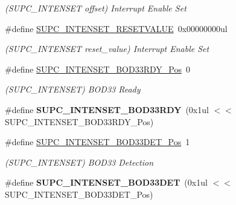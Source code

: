 \begin{DoxyCompactItemize}
\begin{DoxyCompactList}\small\item\em (S\+U\+P\+C\+\_\+\+I\+N\+T\+E\+N\+S\+E\+T offset) Interrupt Enable Set \end{DoxyCompactList}\item 
\hypertarget{group___s_a_m_l21___s_u_p_c_gade21ffefb957ba393b2251437347bd30}{}\#define \hyperlink{group___s_a_m_l21___s_u_p_c_gade21ffefb957ba393b2251437347bd30}{S\+U\+P\+C\+\_\+\+I\+N\+T\+E\+N\+S\+E\+T\+\_\+\+R\+E\+S\+E\+T\+V\+A\+L\+U\+E}~0x00000000ul\label{group___s_a_m_l21___s_u_p_c_gade21ffefb957ba393b2251437347bd30}

\begin{DoxyCompactList}\small\item\em (S\+U\+P\+C\+\_\+\+I\+N\+T\+E\+N\+S\+E\+T reset\+\_\+value) Interrupt Enable Set \end{DoxyCompactList}\item 
\hypertarget{group___s_a_m_l21___s_u_p_c_gac69cfc3d29da8df911624bea5c6ab276}{}\#define \hyperlink{group___s_a_m_l21___s_u_p_c_gac69cfc3d29da8df911624bea5c6ab276}{S\+U\+P\+C\+\_\+\+I\+N\+T\+E\+N\+S\+E\+T\+\_\+\+B\+O\+D33\+R\+D\+Y\+\_\+\+Pos}~0\label{group___s_a_m_l21___s_u_p_c_gac69cfc3d29da8df911624bea5c6ab276}

\begin{DoxyCompactList}\small\item\em (S\+U\+P\+C\+\_\+\+I\+N\+T\+E\+N\+S\+E\+T) B\+O\+D33 Ready \end{DoxyCompactList}\item 
\hypertarget{group___s_a_m_l21___s_u_p_c_ga1d2bc4dfde491e5a98c28a08dc4f8ec0}{}\#define {\bfseries S\+U\+P\+C\+\_\+\+I\+N\+T\+E\+N\+S\+E\+T\+\_\+\+B\+O\+D33\+R\+D\+Y}~(0x1ul $<$$<$ S\+U\+P\+C\+\_\+\+I\+N\+T\+E\+N\+S\+E\+T\+\_\+\+B\+O\+D33\+R\+D\+Y\+\_\+\+Pos)\label{group___s_a_m_l21___s_u_p_c_ga1d2bc4dfde491e5a98c28a08dc4f8ec0}

\item 
\hypertarget{group___s_a_m_l21___s_u_p_c_ga6217695225807518cf2378fae92dcf6d}{}\#define \hyperlink{group___s_a_m_l21___s_u_p_c_ga6217695225807518cf2378fae92dcf6d}{S\+U\+P\+C\+\_\+\+I\+N\+T\+E\+N\+S\+E\+T\+\_\+\+B\+O\+D33\+D\+E\+T\+\_\+\+Pos}~1\label{group___s_a_m_l21___s_u_p_c_ga6217695225807518cf2378fae92dcf6d}

\begin{DoxyCompactList}\small\item\em (S\+U\+P\+C\+\_\+\+I\+N\+T\+E\+N\+S\+E\+T) B\+O\+D33 Detection \end{DoxyCompactList}\item 
\hypertarget{group___s_a_m_l21___s_u_p_c_ga11c1660310dc76a7f0139f670d0645c5}{}\#define {\bfseries S\+U\+P\+C\+\_\+\+I\+N\+T\+E\+N\+S\+E\+T\+\_\+\+B\+O\+D33\+D\+E\+T}~(0x1ul $<$$<$ S\+U\+P\+C\+\_\+\+I\+N\+T\+E\+N\+S\+E\+T\+\_\+\+B\+O\+D33\+D\+E\+T\+\_\+\+Pos)\label{group___s_a_m_l21___s_u_p_c_ga11c1660310dc76a7f0139f670d0645c5}


\end{DoxyCompactItemize}
